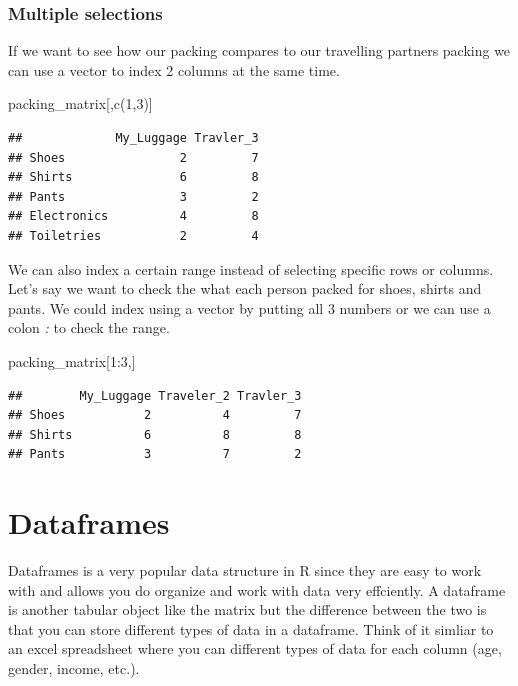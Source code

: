 \documentclass[
]{book}
\newenvironment{Shaded}{\begin{snugshade}}{\end{snugshade}}
\newcommand{\DecValTok}[1]{\textcolor[rgb]{0.00,0.00,0.81}{#1}}
\newcommand{\FunctionTok}[1]{\textcolor[rgb]{0.00,0.00,0.00}{#1}}
\newcommand{\NormalTok}[1]{#1}
\newcommand{\SpecialCharTok}[1]{\textcolor[rgb]{0.00,0.00,0.00}{#1}}
\begin{document}
\hypertarget{multiple-selections}{%
\subsubsection{Multiple selections}\label{multiple-selections}}

If we want to see how our packing compares to our travelling partners packing we can use a vector to index 2 columns at the same time.

\begin{Shaded}
\begin{Highlighting}[]
\NormalTok{packing\_matrix[,}\FunctionTok{c}\NormalTok{(}\DecValTok{1}\NormalTok{,}\DecValTok{3}\NormalTok{)]}
\end{Highlighting}
\end{Shaded}

\begin{verbatim}
##             My_Luggage Travler_3
## Shoes                2         7
## Shirts               6         8
## Pants                3         2
## Electronics          4         8
## Toiletries           2         4
\end{verbatim}

We can also index a certain range instead of selecting specific rows or columns. Let's say we want to check the what each person packed for shoes, shirts and pants. We could index using a vector by putting all 3 numbers or we can use a colon \emph{:} to check the range.

\begin{Shaded}
\begin{Highlighting}[]
\NormalTok{packing\_matrix[}\DecValTok{1}\SpecialCharTok{:}\DecValTok{3}\NormalTok{,]}
\end{Highlighting}
\end{Shaded}

\begin{verbatim}
##        My_Luggage Traveler_2 Travler_3
## Shoes           2          4         7
## Shirts          6          8         8
## Pants           3          7         2
\end{verbatim}

\hypertarget{dataframes}{%
\section{Dataframes}\label{dataframes}}

Dataframes is a very popular data structure in R since they are easy to work with and allows you do organize and work with data very effciently. A dataframe is another tabular object like the matrix but the difference between the two is that you can store different types of data in a dataframe. Think of it simliar to an excel spreadsheet where you can different types of data for each column (age, gender, income, etc.).
\end{document}
